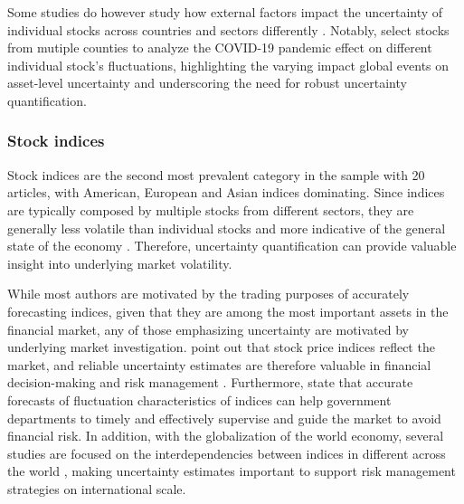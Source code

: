 Some studies do however study how external factors impact the uncertainty of individual stocks across countries and sectors differently \parencite{chandra2021bayesian, soleymani2022longterm}. Notably, \cite{chandra2021bayesian} select stocks from mutiple counties to analyze the COVID-19 pandemic effect on different individual stock's fluctuations, highlighting the varying impact global events on asset-level uncertainty and underscoring the need for robust uncertainty quantification. 

\subsubsection{Stock indices}
Stock indices are the second most prevalent category in the sample with 20 articles, with American, European and Asian indices dominating. Since indices are typically composed by multiple stocks from different sectors, they are generally less volatile than individual stocks and more indicative of the general state of the economy \parencite{sezer2020financial}. Therefore, uncertainty quantification can provide valuable insight into underlying market volatility. 

While most authors are motivated by the trading purposes of accurately forecasting indices, given that they are among the most important assets in the financial market, any of those emphasizing uncertainty are motivated by underlying market investigation. \cite{Suphawan2022gpr} point out that stock price indices reflect the market, and reliable uncertainty estimates are therefore valuable in financial decision-making and risk management \parencite{Wang2021gpr}. Furthermore, \cite{Wang2021gprensemble} state that accurate forecasts of fluctuation characteristics of indices can help government departments to timely and effectively supervise and guide the market to avoid financial risk. In addition, with the globalization of the world economy, several studies are focused on the interdependencies between indices in different across the world \parencite{cao2019multi} \parencite{Malagrino2018Forecasting}, making uncertainty estimates important to support risk management strategies on international scale.

